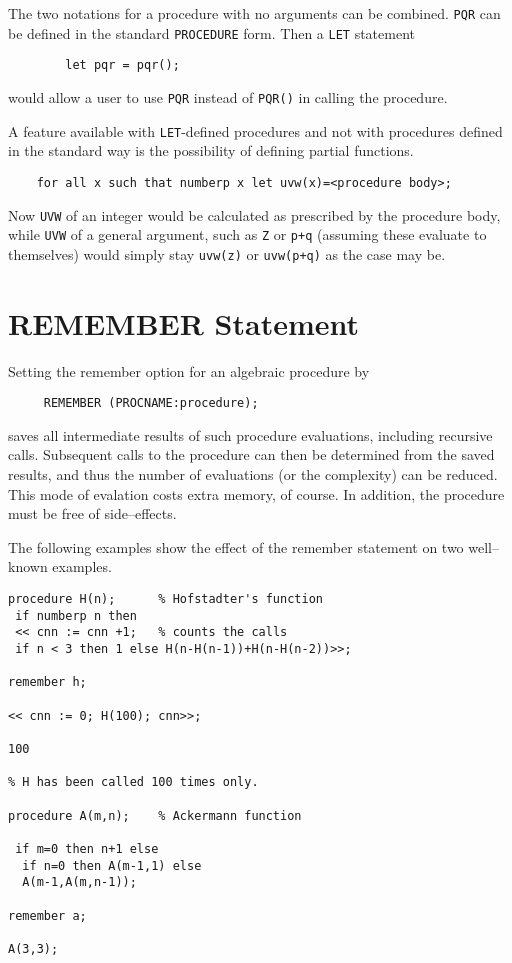 The two notations for a procedure with no arguments can be combined. \texttt{PQR}
can be defined in the standard \texttt{PROCEDURE} form. Then a \texttt{LET}
statement
\begin{verbatim}
        let pqr = pqr();
\end{verbatim}
would allow a user to use \texttt{PQR} instead of \texttt{PQR()} in calling the
procedure.

A feature available with \texttt{LET}-defined procedures and not with procedures
defined in the standard way is the possibility of defining partial
functions.
\begin{verbatim}
    for all x such that numberp x let uvw(x)=<procedure body>;
\end{verbatim}
Now \texttt{UVW} of an integer would be calculated as prescribed by the procedure
body, while \texttt{UVW} of a general argument, such as \texttt{Z} or \texttt{p+q}
(assuming these evaluate to themselves) would simply stay \texttt{uvw(z)}
or \texttt{uvw(p+q)} as the case may be.


\section{REMEMBER Statement}
\hypertarget{command:REMEMBER}{}

Setting the remember option for an algebraic procedure by
\begin{verbatim}
     REMEMBER (PROCNAME:procedure);
\end{verbatim}
saves all intermediate results of such procedure evaluations, including
recursive calls.  Subsequent calls to the procedure can then be determined
from the saved results, and thus the number of evaluations (or the
complexity) can be reduced.  This mode of evalation costs extra memory, of
course.  In addition, the procedure must be free of side--effects.

The following examples show the effect of the remember statement
on two well--known examples.

\begin{samepage}
\begin{verbatim}
procedure H(n);      % Hofstadter's function
 if numberp n then
 << cnn := cnn +1;   % counts the calls
 if n < 3 then 1 else H(n-H(n-1))+H(n-H(n-2))>>;

remember h;

<< cnn := 0; H(100); cnn>>;

100

% H has been called 100 times only.

procedure A(m,n);    % Ackermann function

 if m=0 then n+1 else
  if n=0 then A(m-1,1) else
  A(m-1,A(m,n-1));

remember a;

A(3,3);

\end{verbatim}
\end{samepage}

